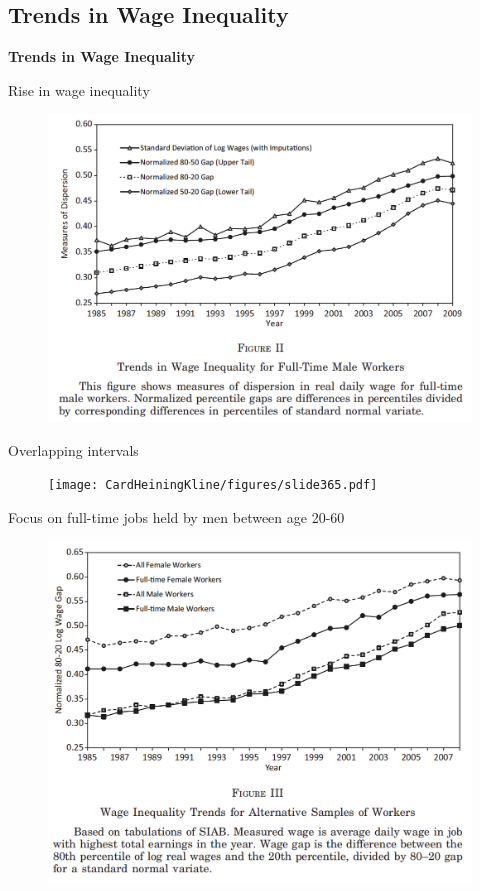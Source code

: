 \documentclass[notes=show]{beamer}
\begin{document}
\subsection*{Trends in Wage Inequality}

\begin{frame}
	\centering
	\textbf{Trends in Wage Inequality}
\end{frame}

\begin{frame}{Rise in wage inequality}
\begin{figure}[p!]
 \includegraphics[width=.9\textwidth]{figures/Fig2} 
\end{figure}
\end{frame}

\begin{frame}{Overlapping intervals}
\begin{figure}[p!]
 \texttt{[image: CardHeiningKline/figures/slide365.pdf]} 
\end{figure}
\end{frame}

\begin{frame}{Focus on full-time jobs held by men between age 20-60}
\begin{figure}[p!]
 \includegraphics[width=.9\textwidth]{figures/Fig3} 
\end{figure}
\end{frame}
\end{document}
